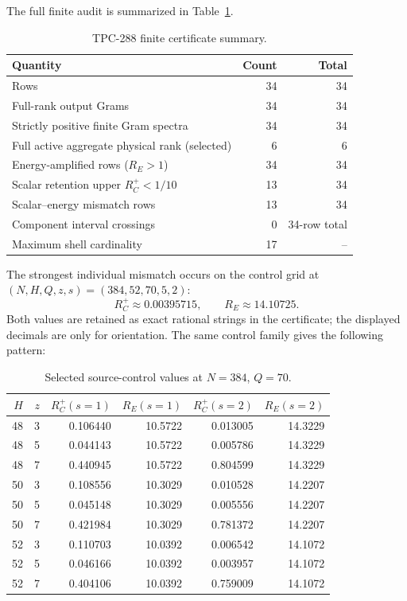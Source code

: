 \documentclass[11pt]{article}
\begin{document}
The full finite audit is summarized in Table~\ref{tab:summary}.

\begin{table}[H]
\centering
\small
\caption{TPC-288 finite certificate summary.}
\label{tab:summary}
\begin{tabular}{lrr}
\toprule
Quantity & Count & Total\\
\midrule
Rows & 34 & 34\\
Full-rank output Grams & 34 & 34\\
Strictly positive finite Gram spectra & 34 & 34\\
Full active aggregate physical rank (selected) & 6 & 6\\
Energy-amplified rows ($R_E>1$) & 34 & 34\\
Scalar retention upper $R_C^+<1/10$ & 13 & 34\\
Scalar--energy mismatch rows & 13 & 34\\
Component interval crossings & 0 & 34-row total\\
Maximum shell cardinality & 17 & --\\
\bottomrule
\end{tabular}
\end{table}

The strongest individual mismatch occurs on the control grid at
$(N,H,Q,z,s)=(384,52,70,5,2)$:
\begin{equation*}
 R_C^+\approx0.00395715,
 \qquad R_E\approx14.10725.
\end{equation*}
Both values are retained as exact rational strings in the certificate; the
displayed decimals are only for orientation.  The same control family gives
the following pattern:

\begin{table}[H]
\centering
\small
\caption{Selected source-control values at $N=384$, $Q=70$.}
\label{tab:controls}
\begin{tabular}{rrrrrr}
\toprule
$H$ & $z$ & $R_C^+(s=1)$ & $R_E(s=1)$ & $R_C^+(s=2)$ & $R_E(s=2)$\\
\midrule
48 & 3 & 0.106440 & 10.5722 & 0.013005 & 14.3229\\
48 & 5 & 0.044143 & 10.5722 & 0.005786 & 14.3229\\
48 & 7 & 0.440945 & 10.5722 & 0.804599 & 14.3229\\
50 & 3 & 0.108556 & 10.3029 & 0.010528 & 14.2207\\
50 & 5 & 0.045148 & 10.3029 & 0.005556 & 14.2207\\
50 & 7 & 0.421984 & 10.3029 & 0.781372 & 14.2207\\
52 & 3 & 0.110703 & 10.0392 & 0.006542 & 14.1072\\
52 & 5 & 0.046166 & 10.0392 & 0.003957 & 14.1072\\
52 & 7 & 0.404106 & 10.0392 & 0.759009 & 14.1072\\
\bottomrule
\end{tabular}
\end{table}
\end{document}
